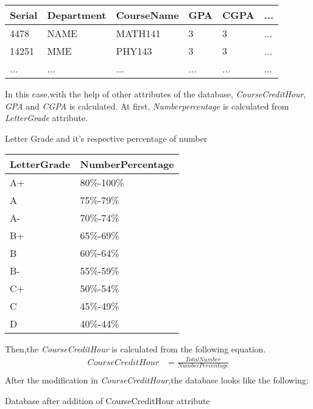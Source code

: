 \documentclass[a4paper,12pt]{book}
\begin{document}
\begin{itemize}
\begin {table}[H]
\begin{center}
\begin{tabular}{ | m{1cm} |  m{2cm} | m{2.1cm} | m{2cm} | m{2cm} | m{0.5cm} | }
\hline
Serial & Department &  CourseName & GPA & CGPA & ... \\ 
\hline
4478 & NAME & MATH141 & 3 & 3 & ... \\ 
\hline
14251 & MME & PHY143 & 3 & 3 & ... \\ 
\hline
... & ... & ... & ... & ... & ... \\ 
\hline
\end{tabular}
\end{center}
\end{table}
In this case,with the help of other attributes of the database, \textit{CourseCreditHour}, \textit{GPA} and \textit{CGPA} is calculated.\newline
At first, \textit{Numberpercentage} is calculated from \textit{LetterGrade} attribute.
\begin {table}[H]
\caption {Letter Grade and it's respective percentage of number} \label{tab:title}
\begin{center}
\begin{tabular}{ | m{2.2cm} |  m{4cm} | } 
\hline
LetterGrade & NumberPercentage \\ 
\hline
A+ & 80\%-100\% \\ 
\hline
A & 75\%-79\% \\
\hline
A- & 70\%-74\% \\
\hline
B+ & 65\%-69\% \\
\hline
B & 60\%-64\% \\
\hline
B- & 55\%-59\% \\
\hline
C+ & 50\%-54\% \\
\hline
C & 45\%-49\% \\ 
\hline
D & 40\%-44\% \\
\hline
\end{tabular}
\end{center}
\end{table}
Then,the \textit{CourseCreditHour} is calculated from the following equation.
\begin{equation} \label{eq1}
\begin{split}
CourseCreditHour & = \frac{TotalNumber}{NumberPercentage} \\
\end{split}
\end{equation}
After the modification in \textit{CourseCreditHour},the database looks like the following:
\begin {table}[H]
\caption {Database after addition of CourseCreditHour attribute} \label{tab:title}
\begin{center}

\end{center}
\end{table}
\end{itemize}
\end{document}
